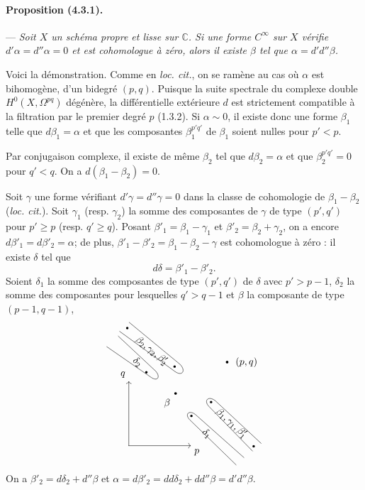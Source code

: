 \documentclass[10pt]{article}
\newcommand{\C}{\mathbb C}
\begin{document}
\paragraph{Proposition (4.3.1).} --- {\itshape Soit $X$ un schéma propre et lisse sur $\C$. Si une forme $C^\infty$ sur $X$ vérifie $d'\alpha=d''\alpha=0$ et est cohomologue à zéro, alors il existe $\beta$ tel que $\alpha=d'd''\beta$.}

Voici la démonstration. Comme en \textit{loc. cit.}, on se ramène au cas où $\alpha$ est bihomogène, d'un bidegré $(p,q)$. Puisque la suite spectrale du complexe double $H^0(X,\Omega^{pq})$ dégénère, la différentielle extérieure $d$ est strictement compatible à la filtration par le premier degré $p$ (1.3.2). Si $\alpha\sim0$, il existe donc une forme $\beta_1$ telle que $d\beta_1=\alpha$ et que les composantes $\beta_1^{p'q'}$ de $\beta_1$ soient nulles pour $p'<p$.

Par conjugaison complexe, il existe de même $\beta_2$ tel que $d\beta_2=\alpha$ et que $\beta_2^{p'q'}=0$ pour $q'<q$. On a $d(\beta_1-\beta_2)=0$.

Soit $\gamma$ une forme vérifiant $d'\gamma=d''\gamma=0$ dans la classe de cohomologie de $\beta_1-\beta_2$ (\textit{loc. cit.}). Soit $\gamma_1$ (resp. $\gamma_2$) la somme des composantes de $\gamma$ de type $(p',q')$ pour $p'\ge p$ (resp. $q'\ge q$). Posant $\beta'_1=\beta_1-\gamma_1$ et $\beta'_2=\beta_2+\gamma_2$, on a encore $d\beta'_1=d\beta'_2=\alpha$; de plus, $\beta'_1-\beta'_2=\beta_1-\beta_2-\gamma$ est cohomologue à zéro : il existe $\delta$ tel que
\[
d\delta=\beta'_1-\beta'_2.
\]
Soient $\delta_1$ la somme des composantes de type $(p',q')$ de $\delta$ avec $p'>p-1$, $\delta_2$ la somme des composantes pour lesquelles $q'>q-1$ et $\beta$ la composante de type $(p-1,q-1)$,
\[
\begin{tikzpicture}[x=.68cm,y=.68cm,baseline=(current bounding box.center),line cap=round,line join=round]
\draw[->] (0,0)--(3.25,0) node[below right] {$p$};
\draw[->] (0,0)--(0,3.35) node[above left] {$q$};
\fill (2.45,2.72) circle (1.3pt) node[below left=2pt] {$\beta$};
\fill (5.15,4.35) circle (1.3pt) node[right=5pt] {$(p,q)$};
\draw (-1.15,5.15)--(1.18,3.55)
  .. controls (1.48,3.34) and (1.68,3.55) .. (1.42,3.87)--(-.55,5.70);
\fill (.92,3.82) circle (1.2pt);
\node[rotate=-39] at (.45,4.35) {$\delta_2$};
\draw (-.48,5.95)--(2.42,3.86)
  .. controls (2.76,3.61) and (3.02,3.86) .. (2.70,4.22)--(.02,6.42);
\fill (-.08,6.12) circle (1.2pt);
\fill (2.40,4.12) circle (1.2pt);
\node[rotate=-39] at (1.20,4.94) {$\beta_2,\gamma_2,\beta'_2$};
\draw (5.62,-1.00)--(3.20,1.34)
  .. controls (2.91,1.62) and (3.14,1.88) .. (3.48,1.63)--(6.03,-.62);
\fill (3.28,1.55) circle (1.2pt);
\node[rotate=-43] at (4.08,.62) {$\delta_1$};
\draw (6.48,-.28)--(4.20,2.04)
  .. controls (3.90,2.35) and (4.17,2.62) .. (4.53,2.34)--(6.93,.12);
\fill (4.31,2.27) circle (1.2pt);
\fill (6.54,-.03) circle (1.2pt);
\node[rotate=-42] at (5.38,1.17) {$\beta_1,\gamma_1,\beta'_1$};
\end{tikzpicture}
\]
On a $\beta'_2=d\delta_2+d''\beta$ et $\alpha=d\beta'_2=dd\delta_2+dd''\beta=d'd''\beta$.
\end{document}
